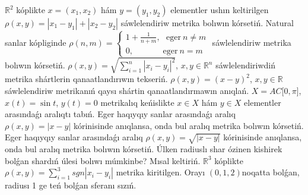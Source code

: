 \(\mathbb{R}^{2}\) kóplikte \(x = \left( x_{1},x_{2} \right)\) hám \(y = \left( y_{1},y_{2} \right)\) elementler ushın keltirilgen \(\rho(x,y) = \left| x_{1} - y_{1} \right| + \left| x_{2} - y_{2} \right|\) sáwlelendiriw metrika bolıwın kórsetiń.
Natural sanlar kópliginde \(\rho(n,m) = \left\{ \begin{matrix} 1 + \frac{1}{n + m},\ \ \ \text{eger}\ n \neq m \\ 0,\ \ \ \ \ \ \ \ \ \ \ \ \ \ \ \ \text{eger}\ n = m \end{matrix} \right.\) sáwlelendiriw metrika bolıwın kórsetiń.
\(\rho(x,y) = \sqrt{\sum_{i = 1}^{n}\left| x_{i} - y_{i} \right|^{2}}\), \(x,y \in \mathbb{R}^{n}\) sáwlelendiriwdiń metrika shártlerin qanaatlandırıwın tekseriń.
\(\rho(x,y) = (x - y)^{2}\), \(x,y\mathbb{\in R}\) sáwlelendiriw metrikanıń qaysı shártin qanaatlandırmawın anıqlań.
\(X = AC\lbrack 0,\pi\rbrack\), \(x(t) = \sin t\), \(y(t) = 0\) metrikalıq keńislikte \(x \in X\) hám \(y \in X\) elementler arasındaǵı aralıqtı tabıń.
Eger haqıyqıy sanlar arasındaǵı aralıq \(\rho(x,y) = |x - y|\) kórinisinde anıqlansa, onda bul aralıq metrika bolıwın kórsetiń.
Eger haqıyqıy sanlar arasındaǵı aralıq \(\rho(x,y) = \sqrt{|x - y|}\) kórinisinde anıqlansa, onda bul aralıq metrika bolıwın kórsetiń.
Úlken radiuslı shar ózinen kishirek bolǵan shardıń úlesi bolıwı múmkinbe? Mısal keltiriń.
\(\mathbb{R}^{3}\) kóplikte \(\rho(x,y) = \sum_{i = 1}^{3}{sgn\left| x_{i} - y_{i} \right|}\) metrika kiritilgen. Orayı \((0,1,2)\)noqatta bolǵan, radiusı 1 ge teń bolǵan sferanı sızıń.